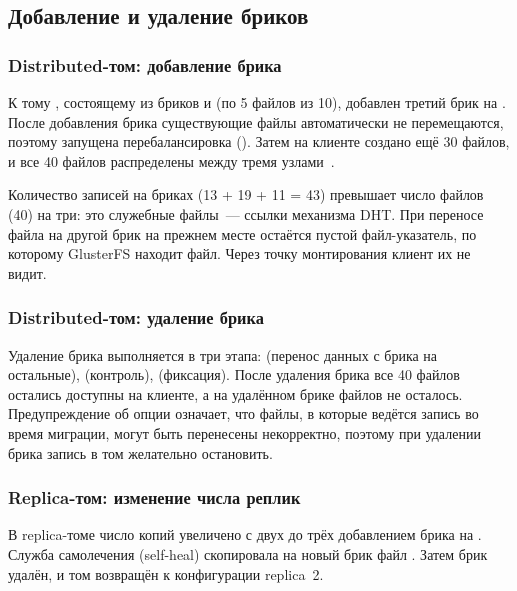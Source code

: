 \subsection{Добавление и удаление бриков}\label{sec:bricks}

\subsubsection{Distributed-том: добавление брика}

К тому , состоящему из бриков  и  (по 5 файлов из 10), добавлен третий брик на . После добавления брика существующие файлы автоматически не перемещаются, поэтому запущена перебалансировка (). Затем на клиенте создано ещё 30 файлов, и все 40 файлов распределены между тремя узлами~\cite{gluster-managing-volumes}.

Количество записей на бриках (13 + 19 + 11 = 43) превышает число файлов (40) на три: это служебные файлы~--- ссылки механизма DHT. При переносе файла на другой брик на прежнем месте остаётся пустой файл-указатель, по которому GlusterFS находит файл. Через точку монтирования клиент их не видит.


\subsubsection{Distributed-том: удаление брика}

Удаление брика выполняется в три этапа:  (перенос данных с брика на остальные),  (контроль),  (фиксация). После удаления брика  все 40 файлов остались доступны на клиенте, а на удалённом брике файлов не осталось. Предупреждение об опции  означает, что файлы, в которые ведётся запись во время миграции, могут быть перенесены некорректно, поэтому при удалении брика запись в том желательно остановить.


\subsubsection{Replica-том: изменение числа реплик}

В replica-томе  число копий увеличено с двух до трёх добавлением брика на . Служба самолечения (self-heal) скопировала на новый брик файл . Затем брик удалён, и том возвращён к конфигурации replica~2.
